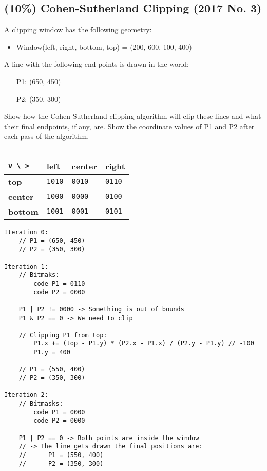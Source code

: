 \subsection{(10\%) Cohen-Sutherland Clipping (2017 No. 3)}
A clipping window has the following geometry:
\begin{itemize}
    \item Window(left, right, bottom, top) = (200, 600, 100, 400)
\end{itemize}

A line with the following end points is drawn in the world:
\begin{itemize}
    \item[P1:] (650, 450)
    \item[P2:] (350, 300)
\end{itemize}

Show how the Cohen-Sutherland clipping algorithm will clip these lines and what their final endpoints, if any, are.  Show the coordinate values of P1 and P2 after each pass of the algorithm.

\rule{\textwidth}{0.1mm}


\begin{tabular}{|l|l|l|l|}
    \hline
    \verb|v \ >| & \textbf{left} & \textbf{center} & \textbf{right} \\ \hline
    \textbf{top}    & \verb|1010| & \verb|0010| & \verb|0110| \\ \hline
    \textbf{center} & \verb|1000| & \verb|0000| & \verb|0100| \\ \hline
    \textbf{bottom} & \verb|1001| & \verb|0001| & \verb|0101| \\ \hline
\end{tabular}

\begin{verbatim}
Iteration 0:
    // P1 = (650, 450)
    // P2 = (350, 300)

Iteration 1:
    // Bitmaks:
        code P1 = 0110
        code P2 = 0000
    
    P1 | P2 != 0000 -> Something is out of bounds
    P1 & P2 == 0 -> We need to clip
    
    // Clipping P1 from top:
        P1.x += (top - P1.y) * (P2.x - P1.x) / (P2.y - P1.y) // -100
        P1.y = 400
    
    // P1 = (550, 400)
    // P2 = (350, 300)

Iteration 2:
    // Bitmasks:
        code P1 = 0000
        code P2 = 0000

    P1 | P2 == 0 -> Both points are inside the window
    // -> The line gets drawn the final positions are:
    //      P1 = (550, 400)
    //      P2 = (350, 300)
\end{verbatim}